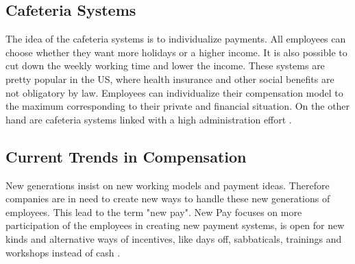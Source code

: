 \documentclass[11pt,a4paper]{article}
\begin{document}
\subsection{Cafeteria Systems}
The idea of the cafeteria systems is to individualize payments. All employees
can choose whether they want more holidays or a higher income. It is also
possible to cut down the weekly working time and lower the income. These
systems are pretty popular in the US, where health insurance and other social
benefits are not obligatory by law. Employees can individualize their
compensation model to the maximum corresponding to their private and financial
situation. On the other hand are cafeteria systems linked with a high
administration effort \cite{HOLTB}.

\subsection{Current Trends in Compensation}
New generations insist on new working models and payment ideas. Therefore
companies are in need to create new ways to handle these new generations of
employees. This lead to the term "new pay". New Pay focuses on more
participation of the employees in creating new payment systems, is open for
new kinds and alternative ways of incentives, like days off, sabbaticals,
trainings and workshops instead of cash \cite{NewPay}.
\clearpage
\raggedright
\end{document}
